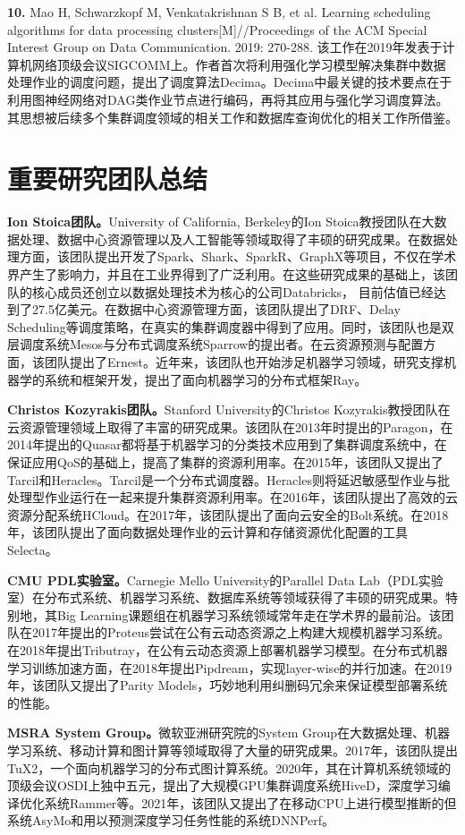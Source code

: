 \textbf{10. }Mao H, Schwarzkopf M, Venkatakrishnan S B, et al. Learning scheduling algorithms for data processing clusters[M]//Proceedings of the ACM Special Interest Group on Data Communication. 2019: 270-288. 该工作在2019年发表于计算机网络顶级会议SIGCOMM上。作者首次将利用强化学习模型解决集群中数据处理作业的调度问题，提出了调度算法Decima。Decima中最关键的技术要点在于利用图神经网络对DAG类作业节点进行编码，再将其应用与强化学习调度算法。其思想被后续多个集群调度领域的相关工作和数据库查询优化的相关工作\parencite{47669,marcus2019neo}所借鉴。


\section{重要研究团队总结}
\textbf{Ion Stoica团队。}University of California, Berkeley的Ion Stoica教授团队在大数据处理、数据中心资源管理以及人工智能等领域取得了丰硕的研究成果。在数据处理方面，该团队提出开发了Spark、Shark、SparkR、GraphX等项目，不仅在学术界产生了影响力，并且在工业界得到了广泛利用。在这些研究成果的基础上，该团队的核心成员还创立以数据处理技术为核心的公司Databricks， 目前估值已经达到了27.5亿美元。在数据中心资源管理方面，该团队提出了DRF、Delay Scheduling等调度策略，在真实的集群调度器中得到了应用。同时，该团队也是双层调度系统Mesos与分布式调度系统Sparrow的提出者。在云资源预测与配置方面，该团队提出了Ernest。近年来，该团队也开始涉足机器学习领域，研究支撑机器学的系统和框架开发，提出了面向机器学习的分布式框架Ray。

\textbf{Christos Kozyrakis团队。}Stanford University的Christos Kozyrakis教授团队在云资源管理领域上取得了丰富的研究成果。该团队在2013年时提出的Paragon，在2014年提出的Quasar都将基于机器学习的分类技术应用到了集群调度系统中，在保证应用QoS的基础上，提高了集群的资源利用率。在2015年，该团队又提出了Tarcil和Heracles。Tarcil是一个分布式调度器。Heracles则将延迟敏感型作业与批处理型作业运行在一起来提升集群资源利用率。在2016年，该团队提出了高效的云资源分配系统HCloud。在2017年，该团队提出了面向云安全的Bolt系统。在2018年，该团队提出了面向数据处理作业的云计算和存储资源优化配置的工具Selecta。

\textbf{CMU PDL实验室。}Carnegie Mello University的Parallel Data Lab（PDL实验室）在分布式系统、机器学习系统、数据库系统等领域获得了丰硕的研究成果。特别地，其Big Learning课题组在机器学习系统领域常年走在学术界的最前沿。该团队在2017年提出的Proteus尝试在公有云动态资源之上构建大规模机器学习系统。在2018年提出Tributray，在公有云动态资源上部署机器学习模型。在分布式机器学习训练加速方面，在2018年提出Pipdream，实现layer-wise的并行加速。在2019年，该团队又提出了Parity Models，巧妙地利用纠删码冗余来保证模型部署系统的性能。

\textbf{MSRA System Group。}微软亚洲研究院的System Group在大数据处理、机器学习系统、移动计算和图计算等领域取得了大量的研究成果。2017年，该团队提出TuX2，一个面向机器学习的分布式图计算系统。2020年，其在计算机系统领域的顶级会议OSDI上独中五元，提出了大规模GPU集群调度系统HiveD，深度学习编译优化系统Rammer等。2021年，该团队又提出了在移动CPU上进行模型推断的但系统AsyMo和用以预测深度学习任务性能的系统DNNPerf。